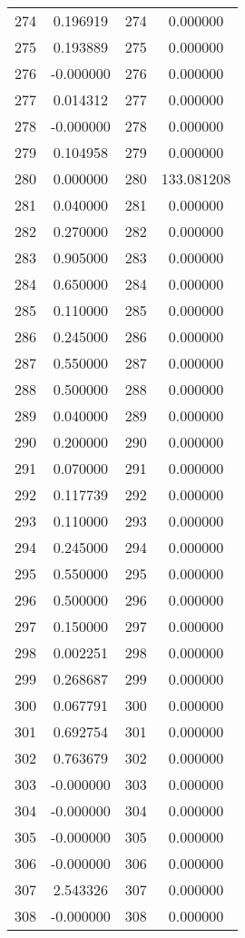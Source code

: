 \documentclass[12pt]{article}
\begin{document}
\begin{longtable}{@{}cccc@{}}
274 & 0.196919 & 274 & 0.000000 \\
275 & 0.193889 & 275 & 0.000000 \\
276 & -0.000000 & 276 & 0.000000 \\
277 & 0.014312 & 277 & 0.000000 \\
278 & -0.000000 & 278 & 0.000000 \\
279 & 0.104958 & 279 & 0.000000 \\
280 & 0.000000 & 280 & 133.081208 \\
281 & 0.040000 & 281 & 0.000000 \\
282 & 0.270000 & 282 & 0.000000 \\
283 & 0.905000 & 283 & 0.000000 \\
284 & 0.650000 & 284 & 0.000000 \\
285 & 0.110000 & 285 & 0.000000 \\
286 & 0.245000 & 286 & 0.000000 \\
287 & 0.550000 & 287 & 0.000000 \\
288 & 0.500000 & 288 & 0.000000 \\
289 & 0.040000 & 289 & 0.000000 \\
290 & 0.200000 & 290 & 0.000000 \\
291 & 0.070000 & 291 & 0.000000 \\
292 & 0.117739 & 292 & 0.000000 \\
293 & 0.110000 & 293 & 0.000000 \\
294 & 0.245000 & 294 & 0.000000 \\
295 & 0.550000 & 295 & 0.000000 \\
296 & 0.500000 & 296 & 0.000000 \\
297 & 0.150000 & 297 & 0.000000 \\
298 & 0.002251 & 298 & 0.000000 \\
299 & 0.268687 & 299 & 0.000000 \\
300 & 0.067791 & 300 & 0.000000 \\
301 & 0.692754 & 301 & 0.000000 \\
302 & 0.763679 & 302 & 0.000000 \\
303 & -0.000000 & 303 & 0.000000 \\
304 & -0.000000 & 304 & 0.000000 \\
305 & -0.000000 & 305 & 0.000000 \\
306 & -0.000000 & 306 & 0.000000 \\
307 & 2.543326 & 307 & 0.000000 \\
308 & -0.000000 & 308 & 0.000000 \\

\end{longtable}
\end{document}
